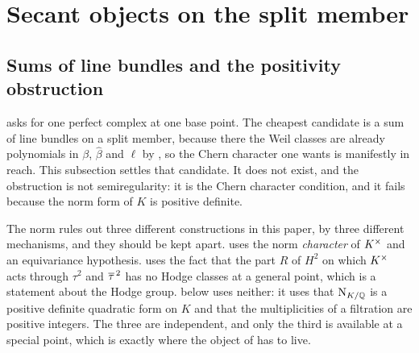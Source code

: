 \section{Secant objects on the split member}\label{sec:secantobjects}

\subsection{Sums of line bundles and the positivity obstruction}
\label{ssec:whatobject}

 asks for one perfect complex at one base point.
The cheapest candidate is a sum of line bundles on a split member, because
there the Weil classes are already polynomials in $\beta$, $\widehat\beta$ and
$\ell$ by \cite[Theorem~15.2]{paperI}, so the Chern character one wants is
manifestly in reach. This subsection settles that candidate. It does not
exist, and the obstruction is not semiregularity: it is the Chern character
condition, and it fails because the norm form of $K$ is positive
definite.

The norm rules out three different constructions in this paper, by three
different mechanisms, and they should be kept apart.
\cite[Theorem~5.6]{paperI} uses the norm \emph{character} of $K^{\times}$ and an
equivariance hypothesis. \cite[Proposition~15.18]{paperI} uses the fact that the part $R$
of $H^{2}$ on which $K^{\times}$ acts through $\tau^{2}$ and $\overline{\tau}^{\,2}$ has no
Hodge classes at a general point, which is a statement about the Hodge group.
 below uses neither: it uses that $\mathrm{N}_{K/\mathbb{Q}}$ is a
positive definite quadratic form on $K$ and that the multiplicities of a
filtration are positive integers. The three are independent, and only the
third is available at a special point, which is exactly where the object of
 has to live.

